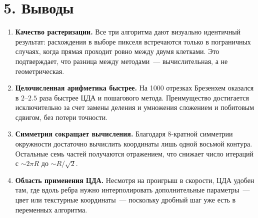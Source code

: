 \documentclass[11pt,a4paper]{article}
\begin{document}
\section*{5. Выводы}
\begin{enumerate}
    \item \textbf{Качество растеризации.} Все три алгоритма дают визуально идентичный результат: расхождения в выборе пикселя встречаются только в пограничных случаях, когда прямая проходит ровно между двумя клетками. Это подтверждает, что разница между методами~--- вычислительная, а не геометрическая.
    \item \textbf{Целочисленная арифметика быстрее.} На 1000 отрезках Брезенхем оказался в $2$--$2.5$ раза быстрее ЦДА и пошагового метода. Преимущество достигается исключительно за счет замены деления и умножения сложением и побитовым сдвигом, без потери точности.
    \item \textbf{Симметрия сокращает вычисления.} Благодаря 8-кратной симметрии окружности достаточно вычислить координаты лишь одной восьмой контура. Остальные семь частей получаются отражением, что снижает число итераций с $\sim 2\pi R$ до $\sim R / \sqrt{2}$.
    \item \textbf{Область применения ЦДА.} Несмотря на проигрыш в скорости, ЦДА удобен там, где вдоль ребра нужно интерполировать дополнительные параметры~--- цвет или текстурные координаты~--- поскольку дробный шаг уже есть в переменных алгоритма.
\end{enumerate}
\end{document}
